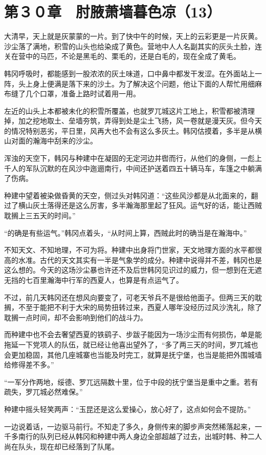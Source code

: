 \section{第３０章　肘腋萧墙暮色凉（13）}

大清早，天上就是灰蒙蒙的一片。到了快中午的时候，天上的云彩更是一片灰黄。沙尘落了满地，积雪的山头也给染成了黄色。营地中人人名副其实的灰头土脸，连关在营中的马匹，不论是黑毛的、栗毛的，还是白毛的，现在全成了黄毛。

韩冈呼吸时，都能感到一股浓浓的灰土味道，口中鼻中都发干发涩。在外面站上一阵，头上身上便满是落下来的沙土。为了解决这个问题，他让下面的人帮忙用细麻布缝了几个口罩，准备上路时试着用一用。

左近的山头上本都被未化的积雪所覆盖，也就罗兀城这片工地上，积雪都被清理掉，加之挖地取土、垒墙夯筑，弄得到处是尘土飞扬，风一卷就是漫天灰。但今天的情况特别恶劣，平日里，风再大也不会有这么多灰土。韩冈估摸着，多半是从横山对面的瀚海中刮来的沙尘。

浑浊的天空下，韩冈与种建中在凝固的无定河边并辔而行，从他们的身侧，一彪上千人的军队沉默的在风沙中迤逦南行，中间还护送着四五十辆马车，车篷之中躺满了伤病。

种建中望着被染做昏黄的天空，侧过头对韩冈道：“这些风沙都是从北面来的，翻过了横山灰土落得还是这么厉害，多半瀚海那里起了狂风。运气好的话，能让西贼耽搁上三五天的时间。”

“的确是有些运气。”韩冈点着头，“从时间上算，西贼此时的确当是在瀚海中。”

不知天文、不知地理，不可为将。种建中出身将门世家，天文地理方面的水平都很高的水准。古代的天文其实有一半是气象学的成分。种建中说得并不差，韩冈也是这么想的。今天的这场沙尘暴也许还不及后世韩冈见识过的威力，但一想到在无遮无挡的七百里瀚海中行军的西夏人，也算是有点运气了。

不过，前几天韩冈还在想风向要变了，可老天爷兵不是很给他面子。但两三天的耽搁，不至于能把不利于大宋的局势扭转过来，西夏人哪年没经历过风沙洗礼，除了耽搁一点时间，却不会影响到他们的战斗力。

而种建中也不会去奢望西夏的铁鹞子、步跋子能因为一场沙尘而有何损伤，单是能拖延一下党项人的队伍，就已经让他喜出望外了，“多了两三天的时间，罗兀城也会更加稳固，其他几座城寨也当能及时完工，就算是抚宁堡，也当是能把外围城墙给修得差不多。”

“一军分作两地，绥德、罗兀远隔数十里，位于中段的抚宁堡当是重中之重。若有疏失，罗兀城必然难保。”

种建中摇头轻笑两声：“玉昆还是这么爱操心，放心好了，这点如何会不提防。”

一边说着话，一边驱马前行。不知走了多久，身侧传来的脚步声突然稀落起来，一千多南行的队列已经从韩冈和种建中两人身边全部超越了过去，出城时韩、种二人尚在队头，现在却已经落到了队尾。

